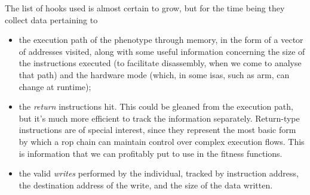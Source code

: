 \documentclass[11pt]{article}
\begin{document}
The list of hooks used is almost certain to grow, but for the time being
they collect data pertaining to
\begin{itemize}
\item the execution path of the phenotype through memory, in the form of
a vector of addresses visited, along with some useful information
concerning the size of the instructions executed (to facilitate
disassembly, when we come to analyse that path) and the hardware
mode (which, in some \glspl{isa}, such as \gls{arm}, can change at
runtime);
\item the \emph{return} instructions hit. This could be gleaned from the
execution path, but it's much more efficient to track the information
separately. Return-type instructions are of special interest, since
they represent the most basic form by which a \gls{rop} chain can
maintain control over complex execution flows. This is information
that we can profitably put to use in the fitness functions.
\item the valid \emph{writes} performed by the individual, tracked by instruction
address, the destination address of the write, and the size of the
data written.
\end{itemize}
\end{document}
